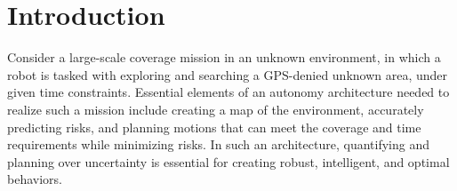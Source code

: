 \documentclass[letterpaper]{article} %
\newcommand{\ph}[1]{{\textbf{#1}:}} %
\begin{document}
\section{Introduction}

Consider a large-scale coverage mission in an unknown environment, in which a robot is tasked with exploring and searching a GPS-denied unknown area, under given time constraints. Essential elements of an autonomy architecture needed to realize such a mission include creating a map of the environment, accurately predicting risks, and planning motions that can meet the coverage and time requirements while minimizing risks.  In such an architecture, quantifying and planning over uncertainty is essential for creating robust, intelligent, and optimal behaviors.


\end{document}

